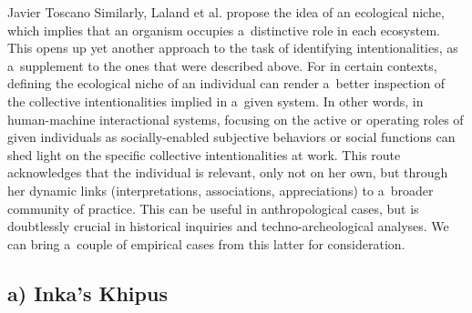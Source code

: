 \begin{artengenv}{Javier Toscano}
Similarly, Laland et al.
\parencite*[][]{laland_niche_2000} %
 propose the idea of an ecological niche, which implies that an organism occupies a~distinctive role in each ecosystem. This opens up yet another approach to the task of identifying intentionalities, as a~supplement to the ones that were described above. For in certain contexts, defining the ecological niche of an individual can render a~better inspection of the collective intentionalities implied in a~given system. In other words, in human-machine interactional systems, focusing on the active or operating roles of given individuals as socially-enabled subjective behaviors or social functions can shed light on the specific collective intentionalities at work. This route acknowledges that the individual is relevant, only not on her own, but through her dynamic links (interpretations, associations, appreciations) to a~broader community of practice. This can be useful in anthropological cases, but is doubtlessly crucial in historical inquiries and techno-archeological analyses. We can bring a~couple of empirical cases from this latter for consideration.

\subsection*{a) Inka's Khipus}


\end{artengenv}
